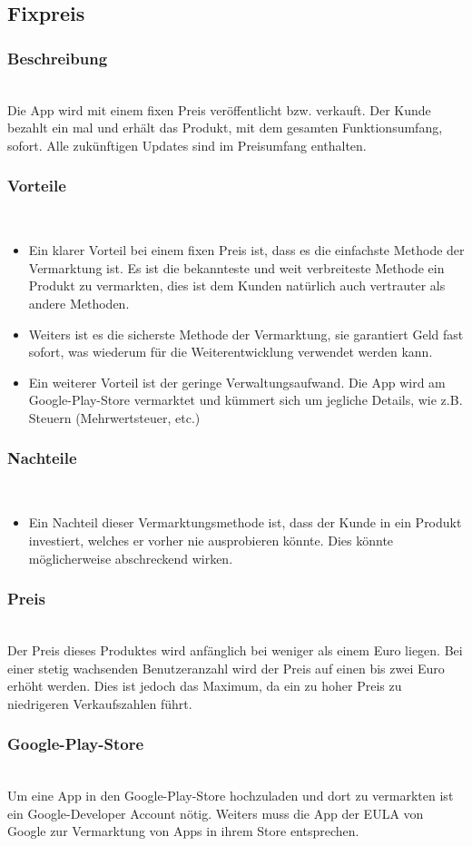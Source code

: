 \documentclass[FIPLY_base.tex]{subfiles}
\begin{document}
	
\subsection{Fixpreis}

\subsubsection{Beschreibung}\ \\
Die App wird mit einem fixen Preis veröffentlicht bzw. verkauft.
Der Kunde bezahlt ein mal und erhält das Produkt, mit dem gesamten Funktionsumfang, sofort.
Alle zukünftigen Updates sind im Preisumfang enthalten.

\subsubsection{Vorteile}\ \\
\begin{itemize}

\item Ein klarer Vorteil bei einem fixen Preis ist, dass es die einfachste Methode der Vermarktung ist.
Es ist die bekannteste und weit verbreiteste Methode ein Produkt zu vermarkten, dies ist dem Kunden natürlich auch vertrauter als andere Methoden.

\item Weiters ist es die sicherste Methode der Vermarktung, sie garantiert Geld fast sofort, was wiederum für die Weiterentwicklung verwendet werden kann.

\item Ein weiterer Vorteil ist der geringe Verwaltungsaufwand. Die App wird am Google-Play-Store vermarktet
und kümmert sich um jegliche Details, wie z.B. Steuern (Mehrwertsteuer, etc.)

\end{itemize}

\subsubsection{Nachteile}\ \\
\begin{itemize}
\item Ein Nachteil dieser Vermarktungsmethode ist, dass der Kunde in ein Produkt investiert, welches er vorher nie ausprobieren könnte.
Dies könnte möglicherweise abschreckend wirken.
\end{itemize}

\subsubsection{Preis}\ \\
Der Preis dieses Produktes wird anfänglich bei weniger als einem Euro liegen.
Bei einer stetig wachsenden Benutzeranzahl wird der Preis auf einen bis zwei Euro erhöht werden.
Dies ist jedoch das Maximum, da ein zu hoher Preis zu niedrigeren Verkaufszahlen führt.

\subsubsection{Google-Play-Store}\ \\
Um eine App in den Google-Play-Store hochzuladen und dort zu vermarkten ist ein Google-Developer Account nötig.
Weiters muss die App der EULA von Google zur Vermarktung von Apps in ihrem Store entsprechen.
\end{document}
